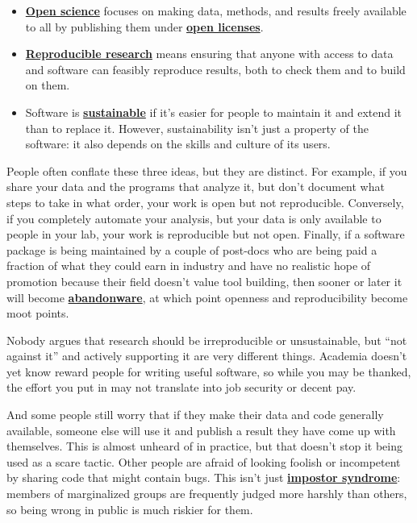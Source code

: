 \documentclass[
]{krantz}
\newcommand{\gref}[2]{\hyperlink{#2}{\textbf{#1}}}
\begin{document}
\begin{itemize}
\item
  \gref{Open science}{open\_science} focuses on making data, methods, and results
  freely available to all by publishing them under \gref{open
  licenses}{open\_license}.
\item
  \gref{Reproducible research}{reproducible\_research} means ensuring that anyone
  with access to data and software can feasibly reproduce results, both to
  check them and to build on them.
\item
  Software is \gref{sustainable}{sustainable\_software} if it's easier for people to
  maintain it and extend it than to replace it. However, sustainability isn't
  just a property of the software: it also depends on the skills and culture
  of its users.
\end{itemize}

People often conflate these three ideas,
but they are distinct.
For example,
if you share your data and the programs that analyze it,
but don't document what steps to take in what order,
your work is open but not reproducible.
Conversely,
if you completely automate your analysis,
but your data is only available to people in your lab,
your work is reproducible but not open.
Finally,
if a software package is being maintained by a couple of post-docs
who are being paid a fraction of what they could earn in industry
and have no realistic hope of promotion because their field doesn't value tool building,
then sooner or later it will become \gref{abandonware}{abandonware},
at which point openness and reproducibility become moot points.

Nobody argues that research should be irreproducible or unsustainable,
but ``not against it'' and actively supporting it are very different things.
Academia doesn't yet know reward people for writing useful software,
so while you may be thanked,
the effort you put in may not translate into job security or decent pay.

And some people still worry that if they make their data and code generally available,
someone else will use it and publish a result they have come up with themselves.
This is almost unheard of in practice,
but that doesn't stop it being used as a scare tactic.
Other people are afraid of looking foolish or incompetent by sharing code that might contain bugs.
This isn't just \gref{impostor syndrome}{impostor\_syndrome}:
members of marginalized groups are frequently judged more harshly than others,
so being wrong in public is much riskier for them.
\end{document}
